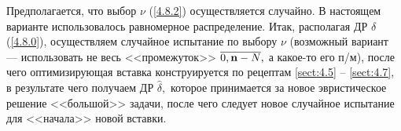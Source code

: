 Предполагается, что выбор $\nu$ (\ref{4.8.2})
осуществляется случайно.
В настоящем варианте использовалось равномерное распределение.
Итак, располагая ДР $\delta$ (\ref{4.8.0}),
осуществляем случайное испытание по выбору $\nu$
(возможный вариант --- использовать не весь <<промежуток>> $\ov{0,\nn-N},$
а какое-то его п/м),
после чего оптимизирующая вставка конструируется по рецептам \ref{sect:4.5} -- \ref{sect:4.7},
в результате чего получаем ДР $\hat{\delta},$
которое принимается за новое эвристическое решение <<большой>> задачи,
после чего следует новое случайное испытание для <<начала>> новой вставки.
